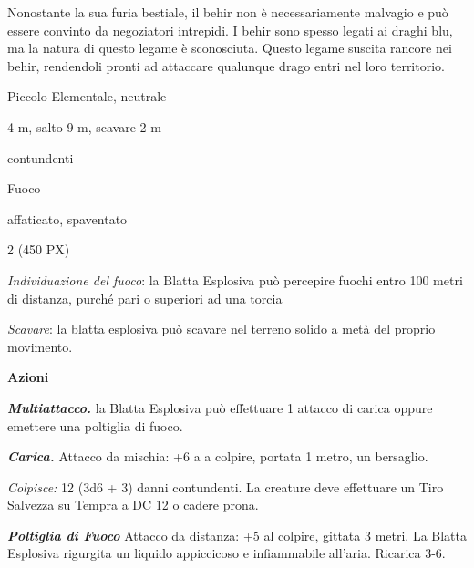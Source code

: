 \begin{multicols}{2}
{Nonostante la sua furia bestiale, il behir non è necessariamente malvagio e può essere convinto da negoziatori intrepidi. I behir sono spesso legati ai draghi blu, ma la natura di questo legame è sconosciuta. Questo legame suscita rancore nei behir, rendendoli pronti ad attaccare qualunque drago entri nel loro territorio.

\begin{description}[noitemsep, topsep=0pt, parsep=0pt, partopsep=0pt, itemsep=1pt, leftmargin=2.35cm,  labelwidth=2.2cm, itemindent=0cm, listparindent=0pt] %
\setlength{\baselineskip}{10pt}
\item[\textbf{Taglia/Tipo}] Piccolo Elementale, neutrale
\item[\textbf{Caratt.}] 
\item[\textbf{Punti Ferita}] 
\item[\textbf{Movimento}] 4 m, salto 9 m, scavare 2 m
\item[\textbf{Tiri Salvez.}] 
\item[\textbf{Res. Danni}] contundenti
\item[\textbf{Imm. Danni}] Fuoco
\item[\textbf{Immunità}] affaticato, spaventato
\item[\textbf{Sensi}] 
\item[\textbf{Sfida}] 2 (450 PX)
\end{description}
\smallskip

\emph{Individuazione del fuoco}: la Blatta Esplosiva può percepire fuochi entro 100 metri di distanza, purché pari o superiori ad una torcia

\emph{Scavare}: la blatta esplosiva può scavare nel terreno solido a metà del proprio movimento.

\textbf{Azioni}

\emph{\textbf{Multiattacco.}} la Blatta Esplosiva può effettuare 1 attacco di carica oppure emettere una poltiglia di fuoco.

\emph{\textbf{Carica.}} Attacco da mischia: +6 a a colpire, portata 1 metro, un bersaglio.

\emph{Colpisce:} 12 (3d6 + 3) danni contundenti. La creature deve effettuare un Tiro Salvezza su Tempra a DC 12 o cadere prona.

\emph{\textbf{Poltiglia di Fuoco}} Attacco da distanza: +5 al colpire, gittata 3 metri. La Blatta Esplosiva rigurgita un liquido appiccicoso e infiammabile all'aria. Ricarica 3-6.

}
\end{multicols}
